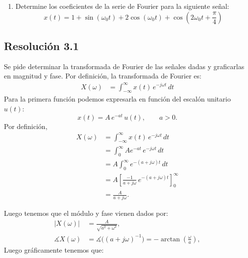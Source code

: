 \documentclass[
  11pt,
  letterpaper,
   addpoints,
   answers
  ]{exam}
\begin{document}
\begin{questions}
\begin{enumerate}
\item Determine los coeficientes de la serie de Fourier para la siguiente señal:
\begin{equation}
  x(t) = 1 + \sin(\omega_0 t) + 2\cos(\omega_0 t) + \cos\left(2\omega_0 t + \frac{\pi}{4}\right)
\end{equation}
\end{enumerate}
\begin{solution}
\subsection*{Resolución 3.1}
Se pide determinar la transformada de Fourier de las señales dadas y graficarlas en magnitud y fase. Por definición, la transformada de Fourier es:
\begin{align}
  X(\omega) &= \int_{-\infty}^{\infty} x(t)\,e^{-j\omega t}\,dt
\end{align}
Para la primera función podemos expresarla en función del escalón unitario \(u(t)\):
\begin{equation}
x(t)=A\,e^{-a t}\,u(t),\qquad a>0.
\end{equation}
Por definición,
\begin{align}
X(\omega)
  &= \int_{-\infty}^{\infty} x(t)\,e^{-j\omega t}\,dt \\
  &= \int_{0}^{\infty} A e^{-a t}\,e^{-j\omega t}\,dt \\
  &= A\int_{0}^{\infty} e^{-(a+j\omega)t}\,dt \\
  &= A\left[\frac{-1}{a+j\omega}\,e^{-(a+j\omega)t}\right]_{0}^{\infty} \\
  &= \frac{A}{a+j\omega}.
\end{align}

Luego tenemos que el módulo y fase vienen dados por:
\begin{align}
|X(\omega)|
  &= \frac{A}{\sqrt{a^{2}+\omega^{2}}},\\
\measuredangle X(\omega)
  &= \measuredangle\big((a+j\omega)^{-1}\big)
   = -\arctan\!\left(\frac{\omega}{a}\right),
\end{align}
Luego gráficamente tenemos que: 

\begin{figure}[H]
  \centering


\end{figure}
\end{solution}
\end{questions}
\end{document}
